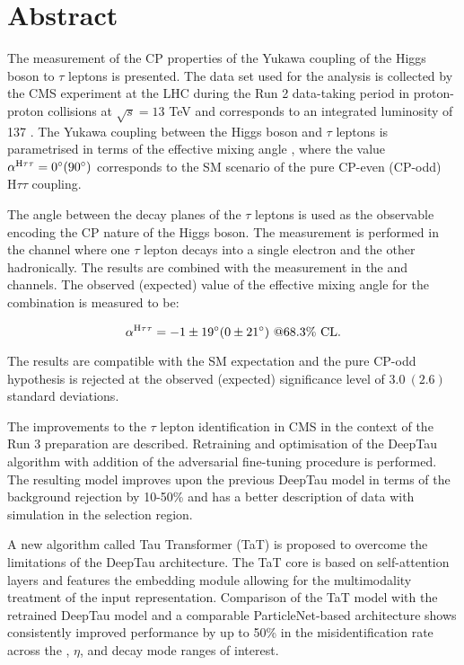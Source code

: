 \thispagestyle{empty}
\vspace{-3cm}
\section*{\centering Abstract}

\noindent

The measurement of the CP properties of the Yukawa coupling of the Higgs boson to $\tau$ leptons is presented. The data set used for the analysis is collected by the CMS experiment at the LHC during the Run 2 data-taking period in proton-proton collisions at $\sqrt{s}=13$ TeV and corresponds to an integrated luminosity of 137 \ifb. The Yukawa coupling between the Higgs boson and $\tau$ leptons is parametrised in terms of the effective mixing angle \mixa, where the value $\alpha^{\text{H}\tau\tau} = 0^\circ (90^\circ)$ corresponds to the SM scenario of the pure CP-even (CP-odd) $\text{H}\tau\tau$ coupling. 

The angle between the decay planes of the $\tau$ leptons is used as the observable encoding the CP nature of the Higgs boson. The measurement is performed in the \et channel where one $\tau$ lepton decays into a single electron and the other hadronically. The results are combined with the measurement in the \mt and \tata channels. The observed (expected) value of the effective mixing angle for the combination is measured to be:

\begin{equation}
    \alpha^{\text{H}\tau\tau} = -1 \pm 19^\circ (0 \pm 21^\circ) ~@68.3\% \text{ CL}.
\end{equation}

The results are compatible with the SM expectation and the pure CP-odd hypothesis is rejected at the observed (expected) significance level of $3.0 ~(2.6)$ standard deviations.

The improvements to the $\tau$ lepton identification in CMS in the context of the Run 3 preparation are described. Retraining and optimisation of the DeepTau algorithm with addition of the adversarial fine-tuning procedure is performed. The resulting model improves upon the previous DeepTau model in terms of the background rejection by 10-50\% and has a better description of data with simulation in the \htt selection region. 

A new algorithm called Tau Transformer (TaT) is proposed to overcome the limitations of the DeepTau architecture. The TaT core is based on self-attention layers and features the embedding module allowing for the multimodality treatment of the input representation. Comparison of the TaT model with the retrained DeepTau model and a comparable ParticleNet-based architecture shows consistently improved performance by up to 50\% in the misidentification rate across the \pt, $\eta$, and decay mode ranges of interest.   


